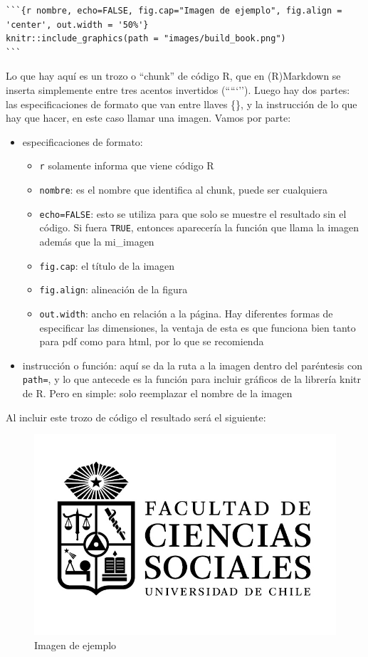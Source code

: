 \documentclass[12pt,twoside]{templates/facsothesis}
\providecommand{\tightlist}{%
  \setlength{\itemsep}{0pt}\setlength{\parskip}{0pt}}
\begin{document}
\begin{verbatim}
```{r nombre, echo=FALSE, fig.cap="Imagen de ejemplo", fig.align = 'center', out.width = '50%'}
knitr::include_graphics(path = "images/build_book.png")
```
\end{verbatim}

Lo que hay aquí es un trozo o ``chunk'' de código R, que en (R)Markdown se inserta simplemente entre tres acentos invertidos (`````''). Luego hay dos partes: las especificaciones de formato que van entre llaves \{\}, y la instrucción de lo que hay que hacer, en este caso llamar una imagen. Vamos por parte:

\begin{itemize}
\tightlist
\item
  especificaciones de formato:

  \begin{itemize}
  \tightlist
  \item
    \texttt{r} solamente informa que viene código R
  \item
    \texttt{nombre}: es el nombre que identifica al chunk, puede ser cualquiera
  \item
    \texttt{echo=FALSE}: esto se utiliza para que solo se muestre el resultado sin el código. Si fuera \texttt{TRUE}, entonces aparecería la función que llama la imagen además que la mi\_imagen
  \item
    \texttt{fig.cap}: el título de la imagen
  \item
    \texttt{fig.align}: alineación de la figura
  \item
    \texttt{out.width}: ancho en relación a la página. Hay diferentes formas de especificar las dimensiones, la ventaja de esta es que funciona bien tanto para pdf como para html, por lo que se recomienda
  \end{itemize}
\item
  instrucción o función: aquí se da la ruta a la imagen dentro del paréntesis con \texttt{path=}, y lo que antecede es la función para incluir gráficos de la librería knitr de R. Pero en simple: solo reemplazar el nombre de la imagen
\end{itemize}

Al incluir este trozo de código el resultado será el siguiente:

\begin{figure}

{\centering \includegraphics[width=0.5\linewidth]{images/facso} 

}

\caption{Imagen de ejemplo}\label{fig:nombre2}
\end{figure}
\end{document}
